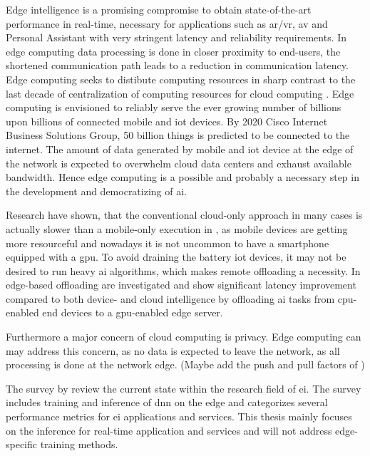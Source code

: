 Edge intelligence is a promising compromise to obtain state-of-the-art performance in real-time, necessary for applications such as \gls{ar}/\gls{vr}, \gls{av} and Personal Assistant with very stringent latency and reliability requirements. In edge computing data processing is done in closer proximity to end-users, the shortened communication path leads to a reduction in communication latency. Edge computing seeks to distibute computing resources in sharp contrast to the last decade of centralization of computing resources for cloud computing \cite{shi_edge_2016}. Edge computing is envisioned to reliably serve the ever growing number of billions upon billions of connected mobile and \gls{iot} devices. By 2020 Cisco Internet Business Solutions Group, 50 billion things is predicted to be connected to the internet. The amount of data generated by mobile and \gls{iot} device at the edge of the network is expected to overwhelm cloud data centers and exhaust available bandwidth. Hence edge computing is a possible and probably a necessary step in the development and democratizing of \gls{ai}.

Research have shown, that the conventional cloud-only approach in many cases is actually slower than a mobile-only execution in \cite{kang_neurosurgeon:_2017}, as mobile devices are getting more resourceful and nowadays it is not uncommon to have a smartphone equipped with a \gls{gpu}. To avoid draining the battery \gls{iot} devices, it may not be desired to run heavy \gls{ai} algorithms, which makes remote offloading a necessity.  In \cite{karlsen_prototyping_nodate} edge-based offloading are investigated and show significant latency improvement compared to both device- and cloud intelligence by offloading \gls{ai} tasks from \gls{cpu}-enabled end devices to a \gls{gpu}-enabled edge server. 

Furthermore a major concern of cloud computing is privacy. Edge computing can may address this concern, as no data is expected to leave the network, as all processing is done at the network edge. (Maybe add the push and pull factors of \cite{zhou_edge_2019}) 
 
The survey  by \citet{zhou_edge_2019} review the current state within the research field of \gls{ei}. The survey includes training and inference of \gls{dnn} on the edge and categorizes several performance metrics for \gls{ei} applications and services. This thesis mainly focuses on the inference for real-time application and services and will not address edge-specific training methods. 


